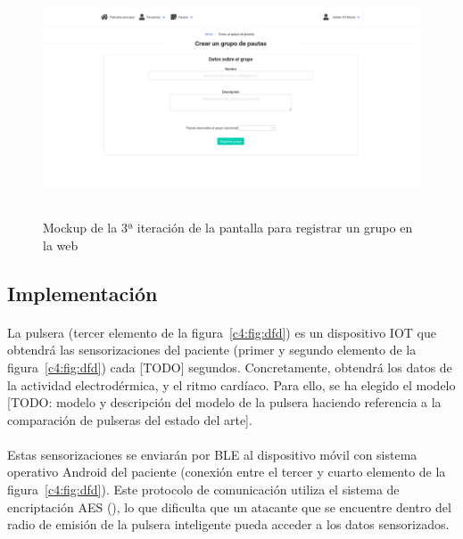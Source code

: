 \begin{figure}[H]
    \centering
    \includegraphics[height=7cm, width=\textwidth]{Imagenes/04DescProblema/mockups/v3/web/12-registrarGrupo.png}
    \caption[Mockup de la 3ª iteración de la pantalla para registrar un grupo en la web]{Mockup de la 3ª iteración de la pantalla para registrar un grupo en la web}
    \label{c4:fig:v3:web:registrarGrupo}
\end{figure}

\subsection{Implementación}
\label{c4:sec:impl}
\paragraph{}
La pulsera (tercer elemento de la figura~\ref{c4:fig:dfd}) es un dispositivo IOT que obtendrá las sensorizaciones del paciente (primer y segundo elemento de la figura~\ref{c4:fig:dfd}) cada [TODO] segundos. Concretamente, obtendrá los datos de la actividad electrodérmica, y el ritmo cardíaco. Para ello, se ha elegido el modelo [TODO: modelo y descripción del modelo de la pulsera haciendo referencia a la comparación de pulseras del estado del arte].

\paragraph{}
Estas sensorizaciones se enviarán por \ac{BLE} al dispositivo móvil con sistema operativo Android del paciente (conexión entre el tercer y cuarto elemento de la figura~\ref{c4:fig:dfd}). Este protocolo de comunicación utiliza el sistema de encriptación \ac{AES} (\citep{ble-aes}), lo que dificulta que un atacante que se encuentre dentro del radio de emisión de la pulsera inteligente pueda acceder a los datos sensorizados.

